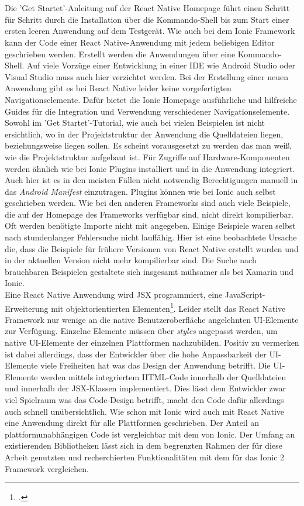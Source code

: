\\
\\
Die 'Get Startet'-Anleitung auf der React Native Homepage führt einen Schritt für Schritt durch die Installation über die Kommando-Shell bis zum Start einer ersten leeren Anwendung auf dem Testgerät. Wie auch bei dem Ionic Framework kann der Code einer React Native-Anwendung mit jedem beliebigen Editor geschrieben werden. Erstellt werden die Anwendungen über eine Kommando-Shell. Auf viele Vorzüge einer Entwicklung in einer IDE wie Android Studio oder Visual Studio muss auch hier verzichtet werden. Bei der Erstellung einer neuen Anwendung gibt es bei React Native leider keine vorgefertigten Navigationselemente. Dafür bietet die Ionic Homepage ausführliche und hilfreiche Guides für die Integration und Verwendung verschiedener Navigationselemente. Sowohl im 'Get Startet'-Tutorial, wie auch bei vielen Beispielen ist nicht ersichtlich, wo in der Projektstruktur der Anwendung die Quelldateien liegen, beziehungsweise liegen sollen. Es scheint vorausgesetzt zu werden das man weiß, wie die Projektstruktur aufgebaut ist. Für Zugriffe auf Hardware-Komponenten werden ähnlich wie bei Ionic Plugins installiert und in die Anwendung integriert. Auch hier ist es in den meisten Fällen nicht notwendig Berechtigungen manuell in das \textit{Android Manifest} einzutragen. Plugins können wie bei Ionic auch selbst geschrieben werden. Wie bei den anderen Frameworks sind auch viele Beispiele, die auf der Homepage des Frameworks verfügbar sind, nicht direkt kompilierbar. Oft werden benötigte Importe nicht mit angegeben. Einige Beispiele waren selbst nach stundenlanger Fehlersuche nicht lauffähig. Hier ist eine beobachtete Ursache die, dass die Beispiele für frühere Versionen von React Native erstellt wurden und in der aktuellen Version nicht mehr kompilierbar sind. Die Suche nach brauchbaren Beispielen gestaltete sich insgesamt mühsamer als bei Xamarin und Ionic.
\\
Eine React Native Anwendung wird JSX programmiert, eine JavaScript-Erweiterung mit objektorientierten Elementen\footcite{JSX}. Leider stellt das React Native Framework nur wenige an die native Benutzeroberfläche angelehnten UI-Elemente zur Verfügung. Einzelne Elemente müssen über \textit{styles} angepasst werden, um native UI-Elemente der einzelnen Plattformen nachzubilden. Positiv zu vermerken ist dabei allerdings, dass der Entwickler über die hohe Anpassbarkeit der UI-Elemente viele Freiheiten hat was das Design der Anwendung betrifft. Die UI-Elemente werden mittels integriertem HTML-Code innerhalb der Quelldateien und innerhalb der JSX-Klassen implementiert. Dies lässt dem Entwickler zwar viel Spielraum was das Code-Design betrifft, macht den Code dafür allerdings auch schnell unübersichtlich. Wie schon mit Ionic wird auch mit React Native eine Anwendung direkt für alle Plattformen geschrieben. Der Anteil an plattformunabhängigen Code ist vergleichbar mit dem von Ionic. Der Umfang an existierenden Bibliotheken lässt sich in dem begrenzten Rahmen der für diese Arbeit genutzten und recherchierten Funktionalitäten mit dem für das Ionic 2 Framework vergleichen.


